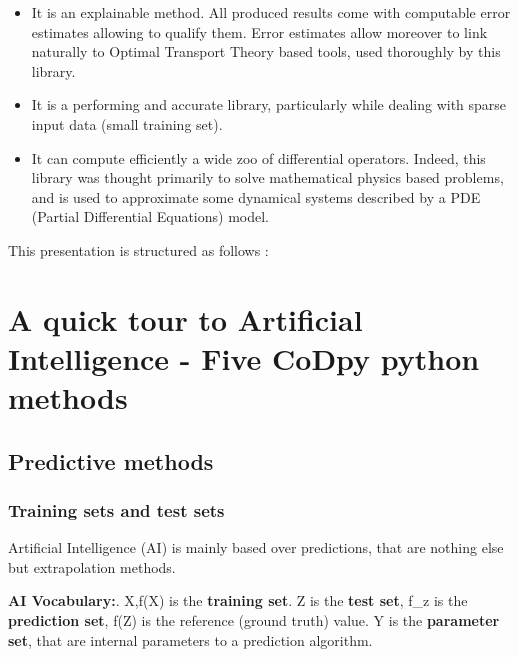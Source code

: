 \documentclass[
]{article}
\def\({}%
\def\){}%
\numberwithin{equation}{section}
\begin{document}
\begin{itemize}
\item It is an explainable method. All produced results come with computable error estimates allowing to qualify them. Error estimates allow moreover to link naturally to Optimal Transport Theory based tools, used thoroughly by this library.  
\item It is a performing and accurate library, particularly while dealing with sparse input data (small training set).
\item It can compute efficiently a wide zoo of differential operators. Indeed, this library was thought primarily to solve mathematical physics based problems, and is used to approximate some dynamical systems described by a PDE (Partial Differential Equations) model.
\end{itemize}

\newpage

This presentation is structured as follows :

\tableofcontents

\newpage

\hypertarget{a-quick-tour-to-artificial-intelligence---five-codpy-python-methods}{%
\section{A quick tour to Artificial Intelligence - Five CoDpy python
methods}\label{a-quick-tour-to-artificial-intelligence---five-codpy-python-methods}}

\hypertarget{predictive-methods}{%
\subsection{Predictive methods}\label{predictive-methods}}

\hypertarget{training-sets-and-test-sets}{%
\subsubsection{Training sets and test
sets}\label{training-sets-and-test-sets}}

Artificial Intelligence (AI) is mainly based over predictions, that are
nothing else but extrapolation methods.

\textbf{AI Vocabulary:}. \(X,f(X)\) is the \textbf{training set}. \(Z\)
is the \textbf{test set}, \(f_z\) is the \textbf{prediction set},
\(f(Z)\) is the reference (ground truth) value. \(Y\) is the
\textbf{parameter set}, that are internal parameters to a prediction
algorithm.
\end{document}
